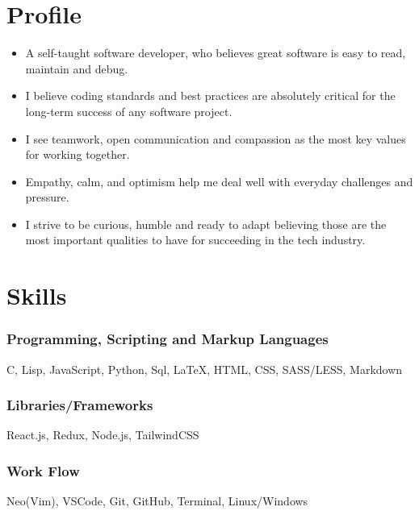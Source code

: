 \documentclass[11pt, oneside, a4paper, titlepage]{article}
\begin{document}
\begin{tcolorbox}
  \begin{minipage}[t]{8cm}
    \vspace*{-0.5cm}
    \begin{tcolorbox}[grow to left by=0.6cm,colback=gray!25,colframe=white]

      \section*{Profile}
      \begin{itemize}
        \item{
      A self-taught software developer,
      who believes great software is easy to read,
      maintain and debug.
          }
        \item{
      I believe coding standards and best practices are absolutely critical
      for the long-term success of any software project.
          }
        \item{
      I see teamwork, open communication and compassion
      as the most key values for working together.
          }
        \item{
      Empathy, calm, and optimism
      help me deal well with everyday challenges and pressure.
        }
      \item{
      I strive to be curious, humble and ready to adapt
      believing those are the most important qualities to have
      for succeeding in the tech industry.
        }
      \end{itemize}


      \section*{Skills}
        \subsubsection{Programming, Scripting and Markup Languages}
        C, Lisp, JavaScript, Python, Sql, {\LaTeX}, HTML, CSS, SASS/LESS, Markdown

        \subsubsection{Libraries/Frameworks}
        React.js, Redux, Node.js, TailwindCSS

        \subsubsection{Work Flow}
        Neo(Vim), VSCode, Git, GitHub, Terminal, Linux/Windows


\end{tcolorbox}
\end{minipage}
\end{tcolorbox}
\end{document}
